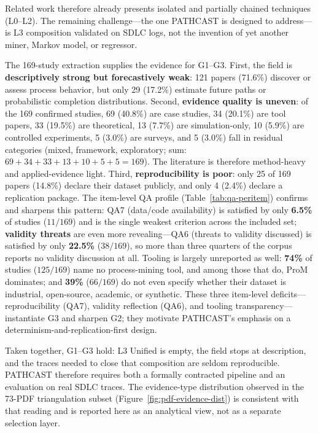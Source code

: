 Related work therefore already presents isolated and partially chained
techniques (L0--L2). The remaining challenge---the one PATHCAST is designed
to address---is L3 composition validated on SDLC logs, not the invention of
yet another miner, Markov model, or regressor.

The 169-study extraction supplies the evidence for G1--G3. First,
the field is \textbf{descriptively strong but forecastively weak}: 121
papers (71.6\%) discover or assess process behavior, but only 29 (17.2\%)
estimate future paths or probabilistic completion distributions. Second,
\textbf{evidence quality is uneven}: of the 169 confirmed studies, 69
(40.8\%) are case studies, 34 (20.1\%) are tool papers, 33 (19.5\%) are
theoretical, 13 (7.7\%) are simulation-only, 10 (5.9\%) are controlled
experiments, 5 (3.0\%) are surveys, and 5 (3.0\%) fall in residual
categories (mixed, framework, exploratory; sum: $69+34+33+13+10+5+5 = 169$).
The literature is therefore method-heavy and applied-evidence light. Third, \textbf{reproducibility is poor}: only 25 of 169 papers
(14.8\%) declare their dataset publicly, and only 4 (2.4\%) declare a
replication package. The item-level QA profile
(Table~\ref{tab:qa-peritem}) confirms and sharpens this pattern: QA7
(data/code availability) is satisfied by only \textbf{6.5\%} of studies
($11/169$) and is the single weakest criterion across the included set;
\textbf{validity threats} are even more revealing---QA6 (threats to validity
discussed) is satisfied by only \textbf{22.5\%} ($38/169$), so more than
three quarters of the corpus reports no validity discussion at all. Tooling
is largely unreported as well: \textbf{74\%} of studies ($125/169$) name no
process-mining tool, and among those that do, ProM dominates; and
\textbf{39\%} ($66/169$) do not even specify whether their dataset is
industrial, open-source, academic, or synthetic. These three item-level
deficits---reproducibility (QA7), validity reflection (QA6), and tooling
transparency---instantiate G3 and sharpen G2; they motivate
PATHCAST's emphasis on a determinism-and-replication-first design.



Taken together, G1--G3 hold: L3 Unified is empty, the field stops at
description, and the traces needed to close that composition are seldom
reproducible. PATHCAST therefore requires both a formally contracted
pipeline and an evaluation on real SDLC traces. The evidence-type
distribution observed in the 73-PDF triangulation subset
(Figure~\ref{fig:pdf-evidence-dist}) is consistent with that reading and is
reported here as an analytical view, not as a separate selection layer.

